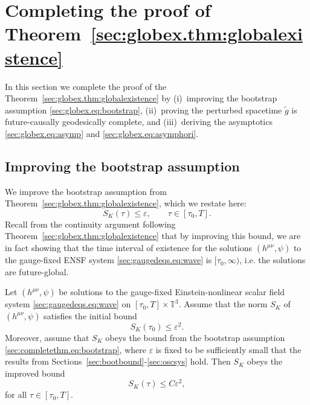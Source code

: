 \documentclass{article}
\newcommand{\TT}{\mathbb{T}}
\newcommand{\wt}{\widetilde}
\newcommand{\ve}{\varepsilon}
\begin{document}
\section{Completing the proof of \texorpdfstring{Theorem~\ref{sec:globex.thm:globalexistence}}{the main theorem}}\label{sec:completethm}
In this section we complete the proof of the Theorem~\ref{sec:globex.thm:globalexistence} by (i)~improving the bootstrap assumption \eqref{sec:globex.eq:bootstrap}, (ii)~proving the perturbed spacetime $\wt{g}$ is future-causally geodesically complete, and (iii)~deriving the asymptotics \eqref{sec:globex.eq:asymp} and \eqref{sec:globex.eq:asymphori}.
\subsection{Improving the bootstrap assumption}
We improve the bootstrap assumption from Theorem~\ref{sec:globex.thm:globalexistence}, which we restate here:
\begin{equation}\label{sec:completethm.eq:bootstrap}
        S_K(\tau) \leq \ve,\qquad \tau \in [\tau_0,T].
\end{equation}
Recall from the continuity argument following Theorem~\ref{sec:globex.thm:globalexistence} that by improving this bound, we are in fact showing that the time interval of existence for the solutions $(h^{\mu\nu},\psi)$ to the gauge-fixed ENSF system \eqref{sec:gaugedeqs.eq:wave} is $[\tau_0,\infty)$, i.e. the solutions are future-global.
\begin{theorem}\label{sec:completethm.thm:bootimp}
    Let $(h^{\mu\nu},\psi)$ be solutions to the gauge-fixed Einstein-nonlinear scalar field system \eqref{sec:gaugedeqs.eq:wave} on $[\tau_0,T]\times \TT^3$. Assume that the norm $S_K$ of $(h^{\mu\nu},\psi)$ satisfies the initial bound
    \begin{equation}\label{sec:completethm.eq:initialbound}
        S_K(\tau_0) \leq \ve^2.
    \end{equation}
    Moreover, assume that $S_K$ obeys the bound from the bootstrap assumption \eqref{sec:completethm.eq:bootstrap}, where $\ve$ is fixed to be sufficiently small that the results from Sections~\ref{sec:bootbound}-\ref{sec:oscsys} hold. Then $S_K$ obeys the improved bound
    \begin{equation}\label{sec:completethm.eq:bootimp}
        S_K(\tau) \leq C\ve^2,
    \end{equation}
    for all $\tau \in [\tau_0,T]$.
\end{theorem}
\end{document}
